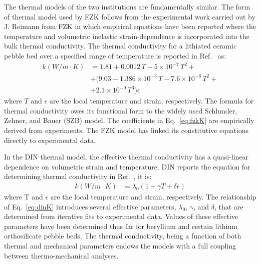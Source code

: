 The thermal models of the two institutions are fundamentally similar. The form of thermal model used by FZK follows from the experimental work carried out by J. Reimann from FZK in which empirical equations have been reported where the temperature and volumetric inelastic strain-dependence is incorporated into the bulk thermal conductivity. The thermal conductivity for a lithiated ceramic pebble bed over a specified range of temperature is reported in Ref.~\cite{Gan2007189} as:
\begin{align}\label{eq:fzkK}
k \left(W/m \cdot K \right)& = 1.81+0.0012  \,T - 5 \times 10^{ - 7} \,T^2 + \nonumber\\
&+ \big(9.03-1.386\times10^{-3} \,T-7.6\times10^{-6}\, T^2 + \nonumber\\
&+ 2.1\times10^{-9} \,T^3\big)\epsilon
\end{align}
where $T$ and $\epsilon$ are the local temperature and strain, respectively. The formula for thermal conductivity owes its functional form to the widely used Schlunder, Zehner, and Bauer (SZB) model. The coefficients in Eq.~\eqref{eq:fzkK} are empirically derived from experiments. The FZK model has  linked its constitutive equations directly to experimental data. 

In the DIN thermal model, the effective thermal conductivity has a quasi-linear dependence on volumetric strain and temperature. DIN reports the equation for determining thermal conductivity in Ref.~\cite{DellOrco:2007hc}, it is:
\begin{align}\label{eq:dinK}
k\left(W/m \cdot K \right)&=\lambda_0\left(1+\gamma T+\delta \epsilon\right)
\end{align}
where T and $\epsilon$ are the local temperature and strain, respectively. The relationship of Eq.~\eqref{eq:dinK} introduces several effective parameters, $\lambda_0$, $\gamma$, and $\delta$, that are determined from iterative fits to experimental data. Values of these effective parameters have been determined thus far for beryllium and certain lithium orthosilicate pebble beds\cite{DiMaio20101234}. The thermal conductivity, being a function of both thermal and mechanical parameters endows the models with a full coupling between thermo-mechanical analyses. 


